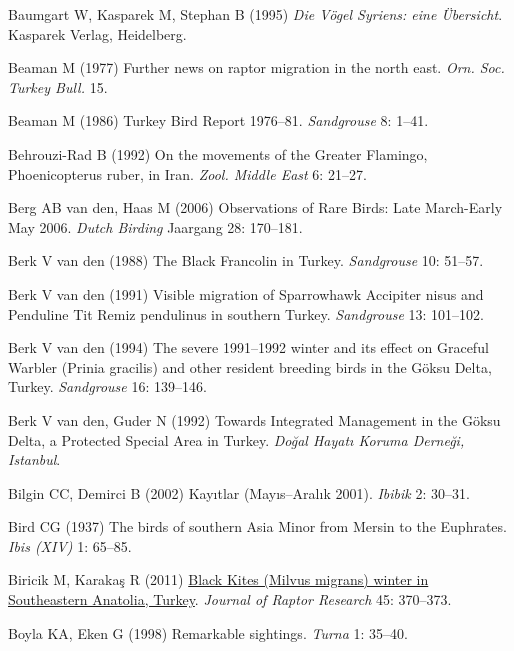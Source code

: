 \documentclass[
  letterpaper,
  DIV=11,
  numbers=noendperiod]{scrreprt}
\newlength{\cslhangindent}
\newenvironment{CSLReferences}[2] %
 {\begin{list}{}{%
  \setlength{\itemindent}{0pt}
  \setlength{\leftmargin}{0pt}
  \setlength{\parsep}{0pt}
  \ifodd #1
   \setlength{\leftmargin}{\cslhangindent}
   \setlength{\itemindent}{-1\cslhangindent}
  \fi
  \setlength{\itemsep}{#2\baselineskip}}}
 {\end{list}}
\begin{document}
\begin{CSLReferences}{0}{1}
Baumgart W, Kasparek M, Stephan B (1995) \emph{{Die Vögel Syriens: eine
Übersicht}}. Kasparek Verlag, Heidelberg.

Beaman M (1977) {Further news on raptor migration in the north east}.
\emph{Orn. Soc. Turkey Bull.} 15.

Beaman M (1986) {Turkey Bird Report 1976--81}. \emph{Sandgrouse} 8:
1--41.

Behrouzi-Rad B (1992) {On the movements of the Greater Flamingo,
{Phoenicopterus ruber}, in Iran}. \emph{Zool. Middle East} 6: 21--27.

Berg AB van den, Haas M (2006) {Observations of Rare Birds: Late
March-Early May 2006}. \emph{Dutch Birding} Jaargang 28: 170--181.

Berk V van den (1988) {The Black Francolin in Turkey}. \emph{Sandgrouse}
10: 51--57.

Berk V van den (1991) {Visible migration of Sparrowhawk {Accipiter
nisus} and Penduline Tit {Remiz pendulinus} in southern Turkey}.
\emph{Sandgrouse} 13: 101--102.

Berk V van den (1994) {The severe 1991--1992 winter and its effect on
Graceful Warbler ({Prinia gracilis}) and other resident breeding birds
in the Göksu Delta, Turkey}. \emph{Sandgrouse} 16: 139--146.

Berk V van den, Guder N (1992) {Towards Integrated Management in the
Göksu Delta, a Protected Special Area in Turkey}. \emph{Doğal Hayatı
Koruma Derneği, Istanbul}.

Bilgin CC, Demirci B (2002) {Kayıtlar (Mayıs--Aralık 2001)}.
\emph{Ibibik} 2: 30--31.

Bird CG (1937) {The birds of southern Asia Minor from Mersin to the
Euphrates}. \emph{Ibis (XIV)} 1: 65--85.

Biricik M, Karakaş R (2011)
\href{https://doi.org/10.3356/JRR-10-109.1}{{Black Kites (Milvus
migrans) winter in Southeastern Anatolia, Turkey}}. \emph{Journal of
Raptor Research} 45: 370--373.

Boyla KA, Eken G (1998) {Remarkable sightings}. \emph{Turna} 1: 35--40.


\end{CSLReferences}
\end{document}

